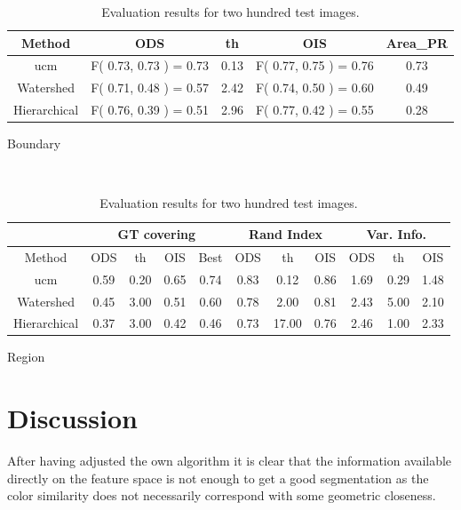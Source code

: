 \documentclass[10pt,twocolumn,letterpaper]{article}
\begin{document}
\begin{table}
\begin{center}
\begin{subtable}{.5\textwidth}
\begin{center}
\begin{tabular}{|c|c|c|c|c|}
\hline
Method & ODS & th & 
OIS & Area\_PR \\
\hline\hline
ucm & F( 0.73, 0.73 ) = 0.73 & 0.13 & 
F( 0.77, 0.75 ) = 0.76 & 0.73\\
Watershed & F( 0.71, 0.48 ) = 0.57 & 2.42 & 
F( 0.74, 0.50 ) = 0.60 & 0.49\\
Hierarchical & F( 0.76, 0.39 ) = 0.51 & 2.96 &
F( 0.77, 0.42 ) = 0.55 & 0.28 \\
\hline
\end{tabular}
\caption{Boundary}
\end{center}
\end{subtable}
~
\begin{subtable}{.5\textwidth}
\begin{center}
\begin{tabular}{|c|c|c|c|c||c|c|c||c|c|c|}
\hline
\multicolumn{1}{|c|}{} &
\multicolumn{4}{c||}{GT covering} &
\multicolumn{3}{c||}{Rand Index} &
\multicolumn{3}{c|}{Var. Info.} \\
\hline
Method & ODS & th & OIS &  Best & 
ODS & th & OIS  & ODS & th & OIS \\
\hline\hline
ucm & 0.59 & 0.20 & 0.65 & 0.74 & 0.83 & 0.12 & 0.86 &
1.69 & 0.29 & 1.48 \\
Watershed & 0.45 & 3.00 & 0.51 & 0.60 & 0.78 & 2.00 & 0.81 &
2.43 & 5.00 & 2.10 \\
Hierarchical & 0.37 & 3.00 & 0.42 & 0.46 & 0.73 & 17.00 & 0.76 &
2.46 & 1.00 & 2.33 \\
\hline
\end{tabular}
\caption{Region}
\end{center}
\end{subtable}
\caption{Evaluation results for two hundred test images.}
\label{tab:P_RF}
\end{center}
\end{table}

\section{Discussion}
After having adjusted the own algorithm it is clear that the information available directly on the feature space is not enough to get a good segmentation as the color similarity does not necessarily correspond with some geometric closeness.
\end{document}

